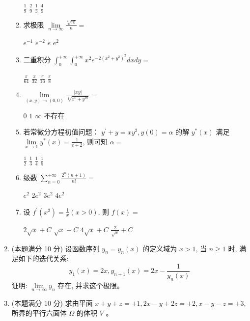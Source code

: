 \begin{enumerate}
\begin{enumerate}
\fourchoices
{$\frac{1}{9}$}
{$\frac{2}{9}$}
{$\frac{1}{3}$}
{$\frac{4}{9}$}

\item 
求极限 $\lim\limits _{n \rightarrow \infty} \frac{\sqrt[n]{n !}}{n}=$  


\fourchoices
{$e^{-1}$}
{$e^{-2}$}
{$e$}
{$e^{2}$}

\item 
二重积分 $\int_{0}^{+\infty} \int_{0}^{+\infty} x^{2} e^{-2\left(x^{2}+y^{2}\right)^{2}} d x d y=$  


\fourchoices
{$\frac{\pi}{64}$}
{$\frac{\pi}{32}$}
{$\frac{\pi}{16}$}
{$\frac{\pi}{8}$}

\item 
$ \lim\limits _{(x, y) \rightarrow(0,0)} \frac{|x y|}{\sqrt[4]{x^{6}+y^{18} }}= $  


\fourchoices
{$ 0 $}
{$ 1 $}
{$ \infty$}
{不存在}

\item 
若常微分方程初值问题： $y^{\prime}+y=x y^{2}, y(0)=\alpha$ 的解 $y^{*}(x)$ 满足 $\lim\limits _{x \rightarrow 1} y^{*}(x)=\frac{1}{e+2}$, 则可知 $\alpha=$  


\fourchoices
{$\frac{1}{2}$}
{$\frac{1}{3}$}
{$\frac{1}{4}$}
{$\frac{1}{5}$}


\item 
级数 $\sum\limits_{n=0}^{+\infty} \frac{2^{n}(n+1)}{n !}=$  


\fourchoices
{$e^{2}$}
{$2 e^{2}$}
{$3 e^{2}$}
{$4 e^{2}$}

\item 
设 $f^{\prime}\left(x^{2}\right)=\frac{1}{x}(x>0)$, 则 $f(x)=$  


\fourchoices
{$2 \sqrt{x}+C$}
{$\sqrt{x}+C$}
{$4 \sqrt{x}+C$}
{$\frac{2}{\sqrt{x}}+C$}

	
	
\end{enumerate}

	


\item 
(本题满分 10 分)
设函数序列 $y_{n}=y_{n}(x)$ 的定义域为 $x>1$, 当 $n \geqslant 1$ 时, 满足如下的迭代关系:
\[
y_{1}(x)=2 x, y_{n+1}(x)=2 x-\frac{1}{y_{n}(x)}
\]
证明: $\lim\limits _{n \rightarrow \infty} y_{n}$ 存在, 并求这个极限。



\item 
(本题满分 10 分)
求由平面 $x+y+z=\pm 1,2 x-y+2 z=\pm 2, x-y-z=\pm 3$, 所界的平行六面体 $\Omega$ 的体积 $V$ 。



\end{enumerate}
